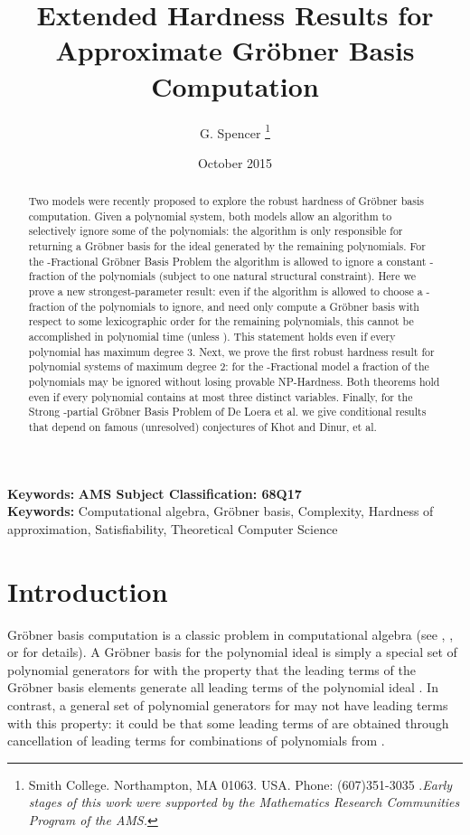 \documentclass{article}
\title{Extended
Hardness Results for\\
 Approximate Gr\"{o}bner Basis Computation}
\author{G. Spencer \thanks{Smith College. Northampton, MA 01063. USA. Phone: (607)351-3035 .\textit{Early stages of this work were supported by the Mathematics Research Communities Program of the AMS.}}}
\date{October 2015}
\begin{document}
\maketitle

\begin{abstract}
Two models were recently proposed to explore the robust hardness of Gr\"{o}bner basis computation. Given a polynomial system, both models allow an algorithm to selectively ignore some of the polynomials: the algorithm is only responsible for returning a Gr\"{o}bner basis for the ideal generated by the remaining polynomials. For the -Fractional Gr\"{o}bner Basis Problem the algorithm is allowed to ignore a constant -fraction of the polynomials (subject to one natural structural constraint). Here we prove a new strongest-parameter result: even if the algorithm is allowed to choose a -fraction of the polynomials to ignore, and need only compute a Gr\"{o}bner basis with respect to some lexicographic order for the remaining polynomials, this cannot be accomplished in polynomial time (unless ). This statement holds even if every polynomial has maximum degree 3. Next, we prove the first robust hardness result for polynomial systems of maximum degree 2: for the -Fractional model a  fraction of the polynomials may be ignored without losing provable NP-Hardness. Both theorems hold even if every polynomial contains at most three distinct variables. Finally, for the Strong -partial Gr\"{o}bner Basis Problem of De Loera et al. we give conditional results that depend on famous (unresolved) conjectures of Khot and Dinur, et al.



\end{abstract}

\noindent \textbf{Keywords:}
\textbf{AMS Subject Classification: 68Q17}\\
\noindent \textbf{Keywords:} Computational algebra, Gr\"{o}bner basis, Complexity, Hardness of approximation, Satisfiability, Theoretical Computer Science 


\section{Introduction}
Gr\"{o}bner basis computation is a classic problem in computational algebra (see \cite{sturmfels2005grobner}, \cite{Cox}, or \cite{Laur} for details). A Gr\"{o}bner basis for the polynomial ideal  is simply a special set of polynomial generators for  with the property that the leading terms of the Gr\"{o}bner basis elements generate all leading terms of the polynomial ideal . In contrast, a general set of polynomial generators  for  may not have leading terms with this property: it could be that some leading terms of  are obtained through cancellation of leading terms for combinations of polynomials from .
\end{document}
